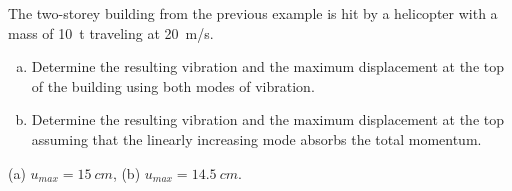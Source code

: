 
\begin{Exercise}[label={two_storey_helicopter}]
The two-storey building from the previous example is hit by a helicopter with a mass of \SI{10}{t} traveling at \SI{20}{m/s}.
\begin{enumerate}[(a)]
    \item Determine the resulting vibration and the maximum displacement at the top of the building using both modes of vibration.
    \item Determine the resulting vibration and the maximum displacement at the top assuming that the linearly increasing mode absorbs the total momentum.
\end{enumerate}
\shortAnswer (a) $u_{max} = \SI{15}{cm}$, (b) $u_{max} = \SI{14.5}{cm}$.
\end{Exercise}



